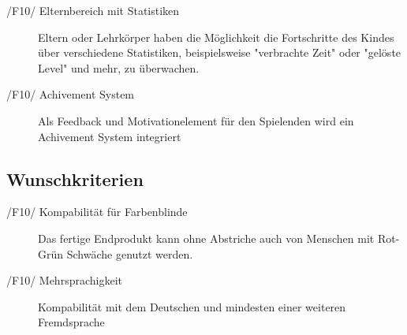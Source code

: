 \begin{description}
	\item[/F10/ Elternbereich mit Statistiken] \label{F10}
	Eltern oder Lehrkörper haben die Möglichkeit die Fortschritte des Kindes über verschiedene Statistiken, beispielsweise "verbrachte Zeit" oder "gelöste Level" und mehr,  zu überwachen.
	\item[/F10/ Achivement System]\label{F10} 
	Als Feedback und Motivationelement für den Spielenden wird ein Achivement System integriert 
\end{description}

\subsection{Wunschkriterien}

\begin{description}
	\item[/F10/ Kompabilität für Farbenblinde] \label{F10} 
	Das fertige Endprodukt kann ohne Abstriche auch von Menschen mit Rot-Grün Schwäche genutzt werden.
	\item[/F10/ Mehrsprachigkeit ]\label{F10} 
	Kompabilität mit dem Deutschen und mindesten einer weiteren Fremdsprache
\end{description}